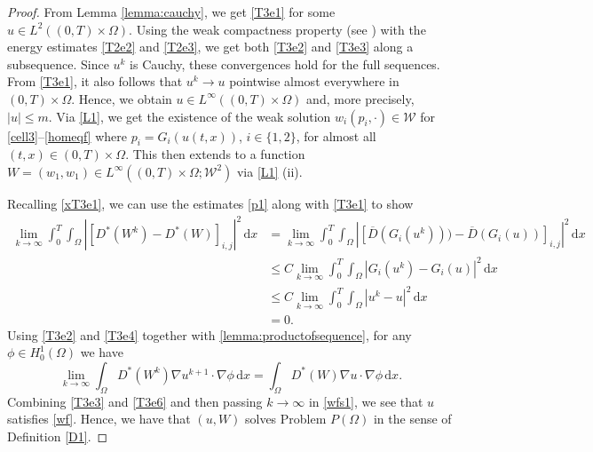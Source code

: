 \documentclass[11pt]{article}
\newcommand{\timeint}{(0,T)}
\newcommand{\di}[1]{\,\mathrm{d}#1}
\begin{document}
\begin{proof}
    From Lemma \ref{lemma:cauchy}, we get \eqref{T3e1} for some $u\in L^2(\timeint\times\Omega)$.
    Using the weak compactness property (see  \cite[Appendix D, Theorem 3]{evans2010partial}) with the energy estimates \eqref{T2e2} and \eqref{T2e3}, we get both \eqref{T3e2} and \eqref{T3e3} along a subsequence.
    Since $u^k$ is Cauchy, these convergences hold for the full sequences.
    From \eqref{T3e1}, it also follows that $u^k\rightarrow u$ pointwise almost everywhere in $\timeint\times\Omega$.
    Hence, we obtain $u\in L^\infty(\timeint\times\Omega)$ and, more precisely, $|u|\leq m$.    
    Via \cref{L1}, we get the existence of the weak solution $w_i(p_i,\cdot)\in \mathcal{W}$ for \eqref{cell3}--\eqref{homeqf} where $p_i=G_i(u(t,x))$, $i\in \{1,2\}$, for almost all $(t,x)\in\timeint\times\Omega$.
    This then extends to a function $W=(w_1,w_1)\in L^\infty(\timeint\times\Omega;\mathcal{W}^2)$ via \cref{L1} (ii).
    
    Recalling \eqref{xT3e1}, we can use the estimates \eqref{p1} along with \eqref{T3e1}  to show
    \begin{align}
        \lim_{k\rightarrow \infty}\int_0^T\int_\Omega |[D^*(W^k)-D^*(W)]_{i,j}|^2\di{x}&=  \lim_{k\rightarrow \infty}\int_0^T\int_\Omega |[\overline{D}(G_i(u^{k})))-\overline{D}(G_i(u))]_{i,j}|^2\di{x}\nonumber\\
        &\leq C  \lim_{k\rightarrow \infty}\int_0^T\int_\Omega |G_i(u^{k})-G_i(u)|^2 \di{x}\nonumber\\
        &\leq C  \lim_{k\rightarrow \infty}\int_0^T\int_\Omega |u^{k}-u|^2 \di{x}\nonumber\\
        &=0.\label{T3e5}
    \end{align}
 Using \eqref{T3e2} and \eqref{T3e4} together with \cref{lemma:productofsequence}, for any $\phi\in H_0^1(\Omega)$ we have
    \begin{equation}
        \lim_{k\rightarrow \infty}\int_{\Omega}D^*(W^k)\nabla u^{k+1}\cdot\nabla \phi \di{x}= \int_{\Omega}D^*(W)\nabla u\cdot\nabla \phi \di{x}.\label{T3e6}
    \end{equation}
Combining  \eqref{T3e3} and \eqref{T3e6} and then passing $k\rightarrow\infty$ in \eqref{wfs1}, we see that $u$ satisfies \eqref{wf}.
Hence, we have that $(u,W)$  solves Problem $P(\Omega) $ in the sense of Definition \ref{D1}.
\end{proof}
\end{document}
